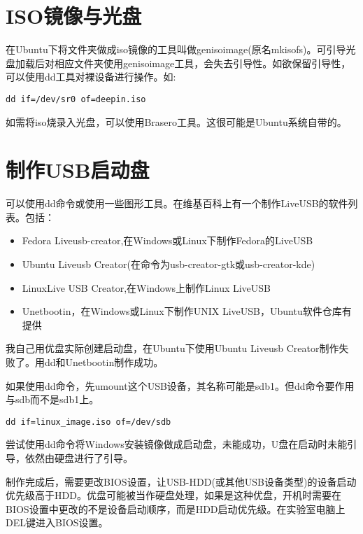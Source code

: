 \section{ISO镜像与光盘}
在Ubuntu下将文件夹做成iso镜像的工具叫做genisoimage(原名mkisofs)。可引导光盘加载后对相应文件夹使用genisoimage工具，会失去引导性。如欲保留引导性，可以使用dd工具对裸设备进行操作。如:

\verb+dd if=/dev/sr0 of=deepin.iso+

如需将iso烧录入光盘，可以使用Brasero工具。这很可能是Ubuntu系统自带的。

\section{制作USB启动盘}
可以使用dd命令或使用一些图形工具。在维基百科上有一个制作LiveUSB的软件列表。包括：
\begin{itemize}
  \item Fedora Liveusb-creator,在Windows或Linux下制作Fedora的LiveUSB
  \item Ubuntu Liveusb Creator(在命令为usb-creator-gtk或usb-creator-kde)
  \item LinuxLive USB Creator,在Windows上制作Linux LiveUSB
  \item Unetbootin，在Windows或Linux下制作UNIX LiveUSB，Ubuntu软件仓库有提供
\end{itemize}
我自己用优盘实际创建启动盘，在Ubuntu下使用Ubuntu Liveusb Creator制作失败了。用dd和Unetbootin制作成功。

如果使用dd命令，先umount这个USB设备，其名称可能是sdb1。但dd命令要作用与sdb而不是sdb1上。
\begin{verbatim}
dd if=linux_image.iso of=/dev/sdb
\end{verbatim}
尝试使用dd命令将Windows安装镜像做成启动盘，未能成功，U盘在启动时未能引导，依然由硬盘进行了引导。

制作完成后，需要更改BIOS设置，让USB-HDD(或其他USB设备类型)的设备启动优先级高于HDD。优盘可能被当作硬盘处理，如果是这种优盘，开机时需要在BIOS设置中更改的不是设备启动顺序，而是HDD启动优先级。在实验室电脑上DEL键进入BIOS设置。


